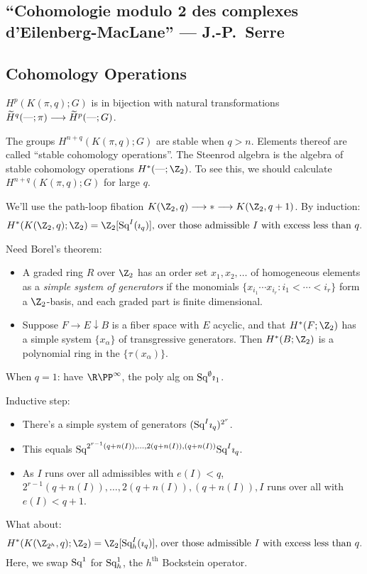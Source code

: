 \documentclass[11pt]{article}
\newcommand{\KanSemResponse}[1]
{
\thispagestyle{fancy}
\subsection*{#1}
}
\begin{document}
\begin{SerreCohModTwoEilMacLane}
\KanSemResponse
{``Cohomologie modulo 2 des complexes d'Eilenberg-MacLane'' --- J.-P.\ Serre}
\subsection*{Cohomology Operations}
\begin{itemise}
\item $H^p(K(\pi,q);G)$ is in bijection with natural transformations $\widetilde H^{q}(\textup{---};\pi)\longrightarrow\widetilde H^{p}(\textup{---};G)$.
\item The groups $H^{n+q}(K(\pi,q);G)$ are stable when $q>n$. Elements thereof are called ``stable cohomology operations''. The Steenrod algebra is the algebra of stable cohomology operations $H^*(\DASH;\Z_2)$. To see this, we should calculate $H^{n+q}(K(\pi,q);G)$ for large $q$.
\item We'll use the path-loop fibation $K(\Z_2,q)\to *\to K(\Z_2,q+1)$. By induction:
\[\text{$H^*(K(\Z_2,q);\Z_2)=\Z_2[\Squ^I(\imath_q)]$, over those admissible $I$ with excess less than $q$.}\]
\item Need Borel's theorem:
\begin{itemize}\squishlist
\item A graded ring $R$ over $\Z_2$ has an order set $x_1,x_2,\ldots$ of homogeneous elements as a \emph{simple system of generators} if the monomials $\{x_{i_1}\cdots x_{i_r}:i_1<\cdots<i_r\}$ form a $\Z_2$-basis, and each graded part is finite dimensional.
\item
Suppose $F\rightarrow E\downarrow B$ is a fiber space with $E$ acyclic, and that $H^*(F;\Z_2)$ has a simple system $\{x_\alpha\}$ of transgressive generators. Then $H^*(B;\Z_2)$ is a polynomial ring in the $\{\tau(x_\alpha)\}$.
\end{itemize}
\item When $q=1$: have $\RP^\infty$, the poly alg on $\textup{Sq}^\emptyset\imath_1$.
\item Inductive step:
\begin{itemize}\squishlist
\item There's a simple system of generators $(\textup{Sq}^I\imath_q)^{2^r}$.
\item This equals $\textup{Sq}^{2^{r-1}(q+n(I)),\ldots,2(q+n(I)),(q+n(I))}\textup{Sq}^I\imath_q$.
\item As $I$ runs over all admissibles with $e(I)<q$, ${2^{r-1}(q+n(I)),\ldots,2(q+n(I)),(q+n(I))},I$ runs over all with $e(I)<q+1$.
\end{itemize}
\item What about:
\[\text{$H^*(K(\Z_{2^h},q);\Z_2)=\Z_2[\Squ^I_h(\imath_q)]$, over those admissible $I$ with excess less than $q$.}\]
Here, we swap $\textup{Sq}^1$ for $\textup{Sq}^1_h$, the $h^\text{th}$ Bockstein operator.


\end{itemise}
\end{SerreCohModTwoEilMacLane}
\end{document}
